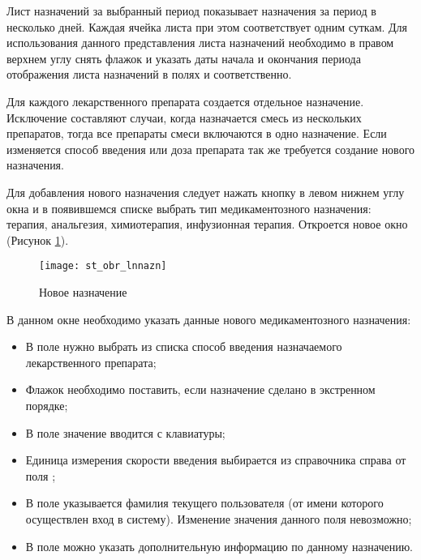 Лист назначений за выбранный период показывает назначения за период в несколько дней. Каждая ячейка листа при этом соответствует одним суткам. Для использования данного представления листа назначений необходимо в правом верхнем углу снять флажок  и указать даты начала и окончания периода отображения листа назначений в полях  и  соответственно.

Для каждого лекарственного препарата создается отдельное назначение. Исключение составляют случаи, когда назначается смесь из нескольких препаратов, тогда все препараты смеси включаются в одно назначение. Если изменяется способ введения или доза препарата так же требуется создание нового назначения.

Для добавления нового назначения следует нажать кнопку  в левом нижнем углу окна и в появившемся списке выбрать тип медикаментозного назначения: терапия, анальгезия, химиотерапия, инфузионная терапия. Откроется новое окно  (Рисунок \ref{img_st_obr_lnnazn}).

\begin{figure}[ht]\centering
   \texttt{[image: st\_obr\_lnnazn]}
   \caption{Новое назначение}
   \label{img_st_obr_lnnazn}
\end{figure} 

В данном окне необходимо указать данные нового медикаментозного назначения:
\begin{itemize}
 \item В поле  нужно выбрать из списка способ введения назначаемого лекарственного препарата;
 \item Флажок  необходимо поставить, если назначение сделано в экстренном порядке;
 \item В поле  значение вводится с клавиатуры;
 \item Единица измерения скорости введения выбирается из справочника справа от поля ;
 \item В поле  указывается фамилия текущего пользователя (от имени которого осуществлен вход в систему). Изменение значения данного поля невозможно;
 \item В поле  можно указать дополнительную информацию по данному назначению.
\end{itemize}
 
